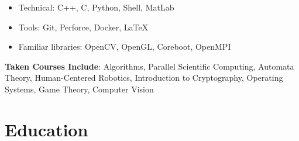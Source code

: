\documentclass{Custom_CV}
\begin{document}
\begin{itemize}[noitemsep]
\item Technical: C++, C, Python, Shell, MatLab
\item Tools: Git, Perforce, Docker, \LaTeX
\item Familiar libraries: OpenCV, OpenGL, Coreboot, OpenMPI
\end{itemize}

\textbf{Taken Courses Include}:
Algorithms, Parallel Scientific Computing, Automata Theory, Human-Centered Robotics, Introduction to Cryptography, Operating Systems, Game Theory, Computer Vision


\section{Education}








\end{document}
